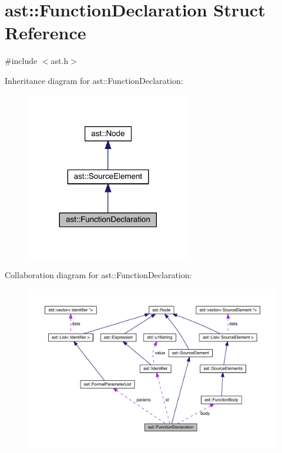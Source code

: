 \hypertarget{structast_1_1_function_declaration}{}\section{ast\+:\+:Function\+Declaration Struct Reference}
\label{structast_1_1_function_declaration}


{\ttfamily \#include $<$ast.\+h$>$}



Inheritance diagram for ast\+:\+:Function\+Declaration\+:
\nopagebreak
\begin{figure}[H]
\begin{center}
\leavevmode
\includegraphics[width=204pt]{structast_1_1_function_declaration__inherit__graph}
\end{center}
\end{figure}


Collaboration diagram for ast\+:\+:Function\+Declaration\+:
\nopagebreak
\begin{figure}[H]
\begin{center}
\leavevmode
\includegraphics[width=350pt]{structast_1_1_function_declaration__coll__graph}
\end{center}
\end{figure}
